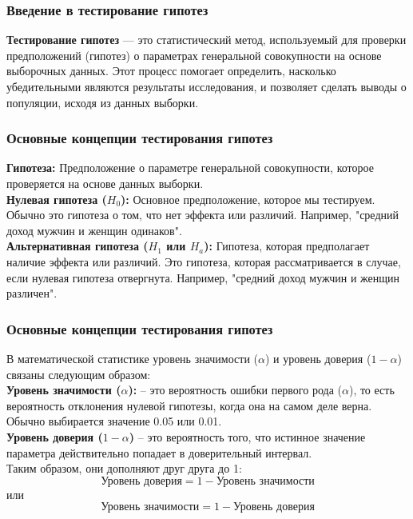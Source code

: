 \documentclass[aspectratio=169]{beamer}
\begin{document}
\begin{frame}
\frametitle{Введение в тестирование гипотез}
{\bf Тестирование гипотез} — это статистический метод, используемый для проверки предположений (гипотез) о параметрах генеральной совокупности на основе выборочных данных. Этот процесс помогает определить, насколько убедительными являются результаты исследования, и позволяет сделать выводы о популяции, исходя из данных выборки.
\end{frame}

\begin{frame}
\frametitle{Основные концепции тестирования гипотез}
{\bf Гипотеза:} Предположение о параметре генеральной совокупности, которое проверяется на основе данных выборки.
\newline\\  
{\bf Нулевая гипотеза ($H_0$):} Основное предположение, которое мы тестируем. Обычно это гипотеза о том, что нет эффекта или различий. Например, "средний доход мужчин и женщин одинаков".
\newline\\  
{\bf Альтернативная гипотеза ($H_1$ или $H_a$):} Гипотеза, которая предполагает наличие эффекта или различий. Это гипотеза, которая рассматривается в случае, если нулевая гипотеза отвергнута. Например, "средний доход мужчин и женщин различен".
\end{frame}

\begin{frame}
\frametitle{Основные концепции тестирования гипотез}
В математической статистике уровень значимости (\(\alpha\)) и уровень доверия (\(1 - \alpha\)) связаны следующим образом:
\newline\\  
{\bf Уровень значимости ($\alpha$):} – это вероятность ошибки первого рода ($\alpha$), то есть вероятность отклонения нулевой гипотезы, когда она на самом деле верна. Обычно выбирается значение 0.05 или 0.01.
\newline\\  
{\bf Уровень доверия (\(1 - \alpha\))} – это вероятность того, что истинное значение параметра действительно попадает в доверительный интервал.\\
Таким образом, они дополняют друг друга до 1:
\[
\text{Уровень доверия} = 1 - \text{Уровень значимости}
\]
или
\[
\text{Уровень значимости} = 1 - \text{Уровень доверия}
\]
\end{frame}
\end{document}
